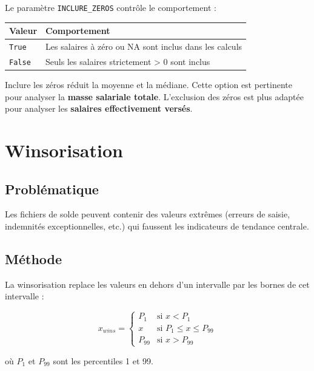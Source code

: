 \documentclass[12pt,a4paper,french]{article}
\newcommand{\colname}[1]{\texttt{#1}}
\begin{document}
Le paramètre \colname{INCLURE\_ZEROS} contrôle le comportement :

\begin{tabularx}{\textwidth}{lX}
    \toprule
    \textbf{Valeur} & \textbf{Comportement} \\
    \midrule
    \texttt{True} & Les salaires à zéro ou NA sont inclus dans les calculs \\
    \texttt{False} & Seuls les salaires strictement > 0 sont inclus \\
    \bottomrule
\end{tabularx}

\begin{warningbox}
    Inclure les zéros réduit la moyenne et la médiane. Cette option est
    pertinente pour analyser la \textbf{masse salariale totale}.
    L'exclusion des zéros est plus adaptée pour analyser les
    \textbf{salaires effectivement versés}.
\end{warningbox}

\section{Winsorisation}

\subsection{Problématique}

Les fichiers de solde peuvent contenir des valeurs extrêmes (erreurs de saisie,
indemnités exceptionnelles, etc.) qui faussent les indicateurs de tendance
centrale.

\subsection{Méthode}

La winsorisation replace les valeurs en dehors d'un intervalle par les
bornes de cet intervalle :

\[
x_{wins} = \begin{cases}
    P_1 & \text{si } x < P_1 \\
    x & \text{si } P_1 \leq x \leq P_{99} \\
    P_{99} & \text{si } x > P_{99}
\end{cases}
\]

où $P_1$ et $P_{99}$ sont les percentiles 1 et 99.
\end{document}
